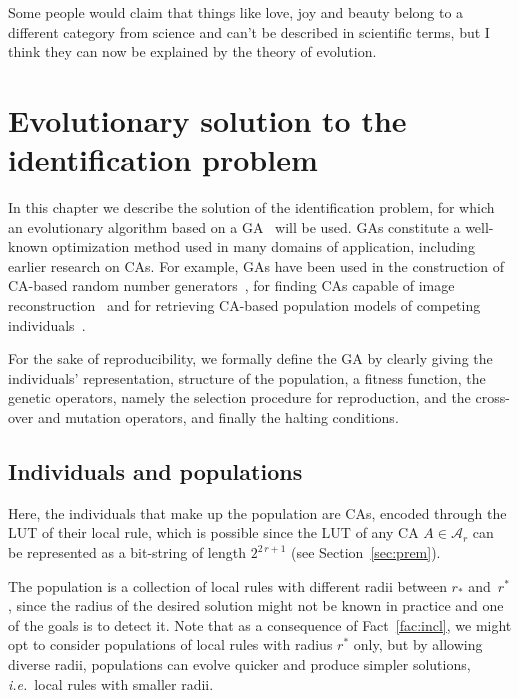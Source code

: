 
\begin{savequote}[99mm]
Some people would claim that things like love, joy and beauty belong to a different category from science and can't be described in scientific terms, but I think they can now be explained by the theory of evolution.
\end{savequote}

\chapter{Evolutionary solution to the identification problem}
\label{chap:id-bin}

In this chapter we describe the solution of the identification problem, for which an evolutionary algorithm based on a GA~\cite{holland1975adaptation} will be used. GAs constitute a  well-known optimization method used in many domains of application, including earlier research on CAs. For example,
GAs have been used in the construction of CA-based random number generators~\cite{TOMASSINI2001151}, for finding CAs capable of image reconstruction~\cite{Seredynski2012} and for retrieving CA-based population models of competing individuals~\cite{Schimit2014}.

For the sake of reproducibility, we formally define the GA by clearly giving the individuals' representation, structure of the population, a fitness function, the genetic operators, namely the selection procedure for reproduction, and the cross-over and mutation operators, and finally the halting conditions.

\section{Individuals and populations}
Here, the individuals that make up the population are CAs, encoded through the LUT of their local rule, which is possible since the LUT of any CA $A\in\mathcal{A}_r$ can be represented as a bit-string of length $2^{2\,r+1}$ (see Section~\ref{sec:prem}).

The population is a collection of local rules with different radii between $r_{\ast}$ and~$r^{\ast}$, since the radius of the desired solution might not be known in practice and one of the goals is to detect it. Note that as a consequence of Fact~\ref{fac:incl}, we might opt to consider populations of local rules with radius $r^{\ast}$ only, but by allowing diverse radii, populations can evolve quicker and produce simpler solutions, \emph{i.e.}\ local rules with smaller radii.

